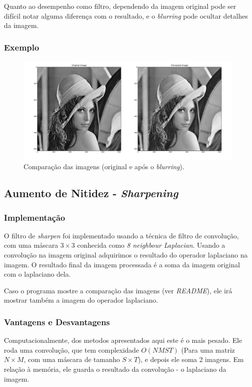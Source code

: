 Quanto ao desempenho como filtro, dependendo da imagem original pode ser difícil notar alguma diferença com o 
resultado, e o \textit{blurring} pode ocultar detalhes da imagem.

\subsubsection{Exemplo}
\begin{figure}[htb]
    \centering
    \includegraphics[width=1.0\textwidth]{blur_example.png}
    \caption{Comparação das imagens (original e após o \textit{blurring}).}
    \label{fig:ex_blur}
\end{figure}

\subsection{Aumento de Nitidez - \textit{Sharpening}}
\subsubsection{Implementação}
O filtro de \textit{sharpen} foi implementado usando a técnica de filtro de convolução, com uma máscara $3\times 3$
conhecida como \textit{8 neighbour Laplacian}. Usando a convolução na imagem original adquirimos o resultado do operador
laplaciano na imagem. O resultado final da imagem processada é a soma da imagem original com o laplaciano dela.

Caso o programa mostre a comparação das imagens (ver \textit{README}), ele irá mostrar também a imagem do operador 
laplaciano. 

\subsubsection{Vantagens e Desvantagens}
Computacionalmente, dos metodos apresentados aqui este é o mais pesado. Ele roda uma convolução, que tem complexidade 
$O(NMST)$ (Para uma matriz $N\times M$, com uma máscara de tamanho $S\times T$), e depois ele soma 2 imagens. Em
relação à memória, ele guarda o resultado da convolução - o laplaciano da imagem.

